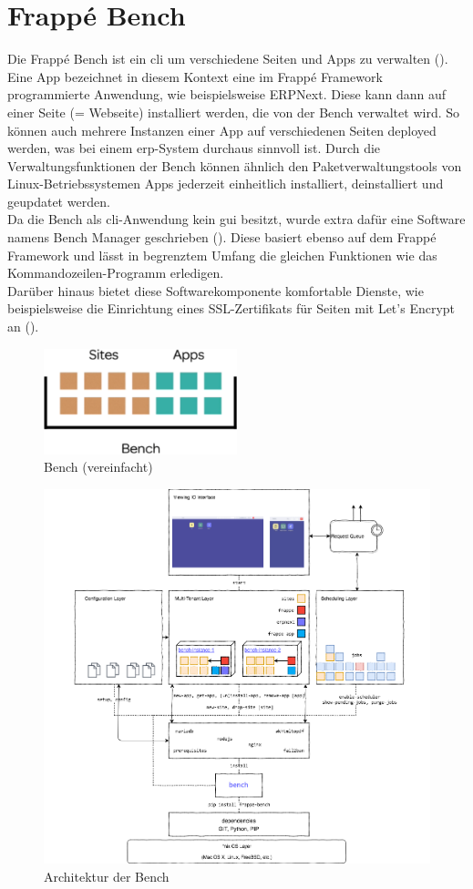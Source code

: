 \section{Frappé Bench}
Die Frappé Bench ist ein \gls{cli} um verschiedene Seiten und Apps zu verwalten (\vgl \cite{GhBench}). 
Eine App bezeichnet in diesem Kontext eine im Frappé Framework programmierte Anwendung, wie beispielsweise ERPNext. Diese kann dann auf einer Seite (= Webseite) installiert werden, die von der Bench verwaltet wird. So können auch mehrere Instanzen einer App auf verschiedenen Seiten deployed werden, was bei einem \gls{erp}-System durchaus sinnvoll ist. Durch die Verwaltungsfunktionen der Bench können ähnlich den Paketverwaltungstools von Linux-Betriebssystemen Apps jederzeit einheitlich installiert, deinstalliert und geupdatet werden.\\
Da die Bench als \gls{cli}-Anwendung kein \gls{gui} besitzt, wurde extra dafür eine Software namens Bench Manager geschrieben (\vgl \cite{GhBenchManager}). Diese basiert ebenso auf dem Frappé Framework und lässt in begrenztem Umfang die gleichen Funktionen wie das Kommandozeilen-Programm erledigen. \\
Darüber hinaus bietet diese Softwarekomponente komfortable Dienste, wie beispielsweise die Einrichtung eines SSL-Zertifikats für Seiten mit Let's Encrypt an (\vgl \cite{GhBenchSsl}).
\begin{figure}
  \centering
  \includegraphics[width=0.5\textwidth]{Bilder/Bench_vereinfacht.png}
  \caption{Bench (vereinfacht)}
  \label{fig:benchVereinfacht}
\end{figure}
\begin{figure}
  \centering
  \includegraphics[width=\textwidth]{Bilder/Bench.png}
  \caption{Architektur der Bench}
  \label{fig:bench}
\end{figure}